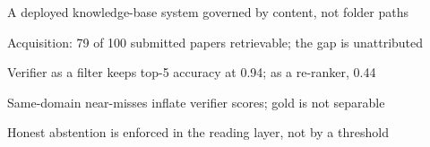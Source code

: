 \begin{highlights}
\item A deployed knowledge-base system governed by content, not folder paths
\item Acquisition: 79 of 100 submitted papers retrievable; the gap is unattributed
\item Verifier as a filter keeps top-5 accuracy at 0.94; as a re-ranker, 0.44
\item Same-domain near-misses inflate verifier scores; gold is not separable
\item Honest abstention is enforced in the reading layer, not by a threshold
\end{highlights}
